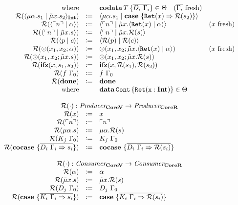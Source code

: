 \[\begin{array}{rcll}
    \text{where} &  & \codata{T}{\overline{D_i\ \Gamma_i}} \in \Theta \quad \fresh{\overline{\Gamma_i}} & \\
    \redundancy{\cut{\mu\alpha.s_1}{\tilde{\mu}x.s_2}_\tyint} & \coloneq & \cut{\mu\alpha.s_1}{\case{\mathtt{Ret}(x) \Rightarrow \redundancy{s_2}}} & \\
    \redundancy{\cut{\lit{n}}{\alpha}} & \coloneq & \cut{\lit{n}}{\tilde{\mu}x.\cut{\mathtt{Ret}(x)}{\alpha}} & \fresh{x} \\
    \redundancy{\cut{\lit{n}}{\tilde{\mu}x.s}} & \coloneq & \cut{\lit{n}}{\tilde{\mu}x.\redundancy{s}} & \\
    \redundancy{\cut{p}{c}} & \coloneq & \cut{\redundancy{p}}{\redundancy{c}} & \\
    \redundancy{\odot(x_1, x_2; \alpha)}{} & \coloneq & \odot(x_1, x_2; \tilde{\mu}x.\cut{\mathtt{Ret}(x)}{\alpha}) & \fresh{x} \\
    \redundancy{\odot(x_1, x_2; \tilde{\mu}x.s)}{} & \coloneq & \odot(x_1, x_2; \tilde{\mu}x.\redundancy{s}) & \\
    \redundancy{\ifz{x}{s_1}{s_2}}{} & \coloneq & \ifz{x}{\redundancy{s_1}}{\redundancy{s_2}} & \\
    \redundancy{f\ \Gamma_0}{} & \coloneq & f\ \Gamma_0 & \\
    \redundancy{\done}{} & \coloneq & \done & \\
    \text{where} & & \data{\mathtt{Cont}}{\mathtt{Ret(x : \tyint)}} \in \Theta & \\
    \\
    \multicolumn{4}{c}{\redundancy{\cdot} : \emph{Producer}_{\targetvar{}} \rightarrow \emph{Producer}_{\targetred{}}}\\
    \redundancy{x} & \coloneq & x & \\
    \redundancy{\lit{n}} & \coloneq & \lit{n} & \\
    \redundancy{\mu\alpha.s} & \coloneq & \mu\alpha.\redundancy{s} & \\
    \redundancy{K_j\ \Gamma_0} & \coloneq & K_j\ \Gamma_0 & \\
    \redundancy{\cocase{\overline{D_i\ \Gamma_i \Rightarrow s_i}}} & \coloneq & \cocase{\overline{D_i\ \Gamma_i \Rightarrow \redundancy{s_i}}} & \\
    \\
    \multicolumn{4}{c}{\redundancy{\cdot} : \emph{Consumer}_{\targetvar{}} \rightarrow \emph{Consumer}_{\targetred{}}}\\
    \redundancy{\alpha} & \coloneq & \alpha & \\
    \redundancy{\tilde{\mu}x.s} & \coloneq & \tilde{\mu}x.\redundancy{s} & \\
    \redundancy{D_j\ \Gamma_0} & \coloneq & D_j\ \Gamma_0 & \\
    \redundancy{\case{\overline{K_i\ \Gamma_i \Rightarrow s_i}}} & \coloneq & \case{\overline{K_i\ \Gamma_i \Rightarrow \redundancy{s_i}}} & \\
  \end{array}
\]

